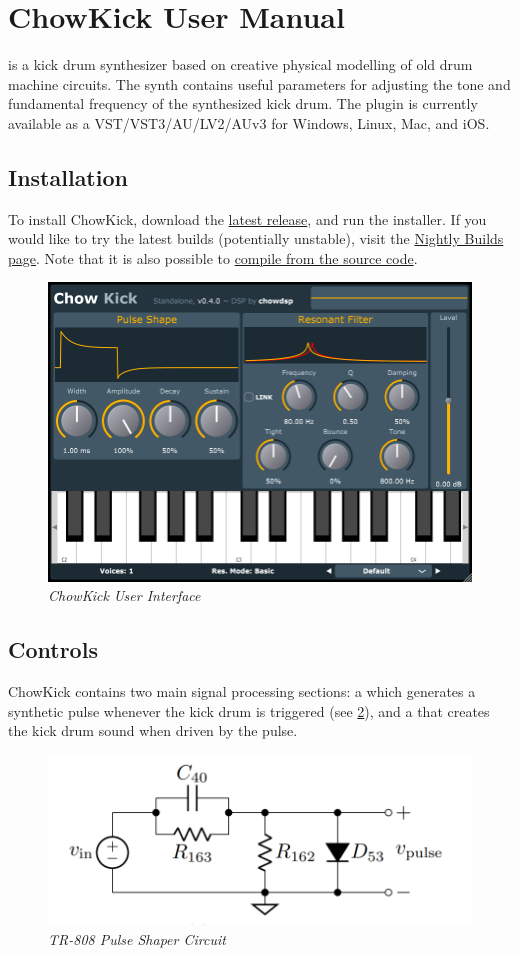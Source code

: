 \documentclass[landscape,twocolumn,a5paper]{manual}
\def\dllink#1{\href{https://chowdsp.com/products.html\#kick}{#1}}
\begin{document}
\section{ChowKick User Manual}

\noindent
{} is a kick drum synthesizer based
on creative physical modelling of old drum machine circuits.
The synth contains useful parameters for adjusting the tone
and fundamental frequency of the synthesized kick drum.
The plugin is currently available as a VST/VST3/AU/LV2/AUv3
for Windows, Linux, Mac, and iOS.

\subsection{Installation}
To install ChowKick, download the \dllink{latest release},
and run the installer. If you would like to try the
latest builds (potentially unstable), visit the
\href{https://chowdsp.com/nightly.html\#kick}{Nightly Builds page}.
Note that it is also possible to
\href{https://github.com/Chowdhury-DSP/ChowKick#Building}{compile from the source code}.

\begin{figure}[ht]
    \center
    \includegraphics[width=0.75\columnwidth]{screenshots/full_gui.png}
    \caption{\label{fig:full_gui}{\it ChowKick User Interface}}
\end{figure}

\subsection{Controls}
ChowKick contains two main signal processing sections:
a  which generates a synthetic
pulse whenever the kick drum is triggered (see \cref{fig:pulse_shaper}),
and a  that creates the kick
drum sound when driven by the pulse.
%
\begin{figure}[ht]
    \center
    \includegraphics[width=0.65\columnwidth]{figures/pulse_shaper.png}
    \caption{\label{fig:pulse_shaper}{\it TR-808 Pulse Shaper Circuit}}
\end{figure}
\end{document}
